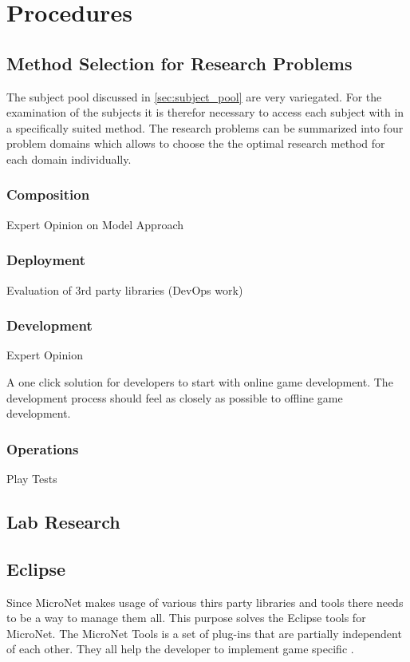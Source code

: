 \section{Procedures}

\subsection{Method Selection for Research Problems}

The subject pool discussed in \autoref{sec:subject_pool} are very variegated.
For the examination of the subjects it is therefor necessary to access each
subject with in a specifically suited method. The research problems can be
summarized into four problem domains which allows to choose the the optimal
research method for each domain individually.

\subsubsection{Composition}
Expert Opinion on Model Approach

\subsubsection{Deployment}
Evaluation of 3rd party libraries (DevOps work)


\subsubsection{Development}
Expert Opinion

A one click solution for developers to start with online game
  	  development. The development process should feel as closely as possible to
  	  offline game development.

\subsubsection{Operations}
Play Tests

\subsection{Lab Research}
\label{sub:lab_reserach}

\subsection{Eclipse}

Since MicroNet makes usage of various thirs party libraries and tools there
needs to be a way to manage them all. This purpose solves the Eclipse tools for
MicroNet. The MicroNet Tools is a set of plug-ins that are partially independent
of each other. They all help the developer to implement game specific \mss{}.

